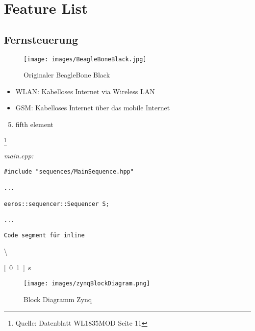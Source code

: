 


\chapter{Feature List}
\section{Fernsteuerung}


\begin{figure}[!ht]
\centering
\texttt{[image: images/BeagleBoneBlack.jpg]}
\caption{Originaler BeagleBone Black}
\label{fig:BeagleBoneBlack}
\end{figure}


\begin{itemize}
\item WLAN: Kabelloses Internet via Wireless LAN
\item GSM: Kabelloses Internet über das mobile Internet
\end{itemize}


\begin{enumerate}
  \setcounter{enumi}{4}
  \item fifth element
\end{enumerate}

\footnote{Quelle: Datenblatt WL1835MOD Seite 11}

\-\hspace{2cm}

\textit{main.cpp:}\
\begin{lstlisting}
#include "sequences/MainSequence.hpp"

...

eeros::sequencer::Sequencer S;

...
\end{lstlisting}


\texttt{Code segment für inline} 

\textbackslash

\usepackage{units}
\unit[0.1]{s}



\usepackage{pifont}
\newcommand{\cmark}{}%
\newcommand{\xmark}{}%
\cmark
\xmark

\begin{figure}[htbp]
	\centering
		\texttt{[image: images/zynqBlockDiagram.png]}
	\caption[Block Diagramm Zynq]{Block Diagramm Zynq\footnotemark}
	\label{fig:BlockDiagrammZynq}
\end{figure}

